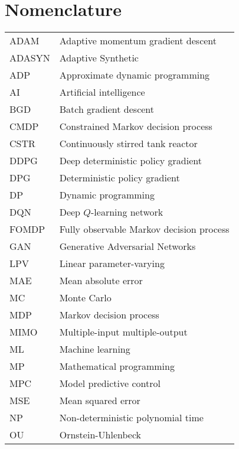 \documentclass[12pt]{report}
\begin{document}
\chapter*{Nomenclature}
\noindent 
\begin{tabular}{@{}ll}
ADAM & Adaptive momentum gradient descent \\
ADASYN & Adaptive Synthetic \\
ADP & Approximate dynamic programming \\
AI & Artificial intelligence \\
BGD & Batch gradient descent \\
CMDP & Constrained Markov decision process \\
CSTR & Continuously stirred tank reactor \\
DDPG & Deep deterministic policy gradient \\
DPG & Deterministic policy gradient \\
DP & Dynamic programming \\
DQN & Deep $Q$-learning network \\
FOMDP & Fully observable Markov decision process \\
GAN & Generative Adversarial Networks \\
LPV & Linear parameter-varying \\
MAE & Mean absolute error \\
MC & Monte Carlo \\
MDP & Markov decision process \\
MIMO & Multiple-input multiple-output \\
ML & Machine learning \\
MP & Mathematical programming \\
MPC & Model predictive control \\
MSE & Mean squared error \\
NP & Non-deterministic polynomial time \\
OU & Ornstein-Uhlenbeck \\
\end{tabular}
\end{document}
